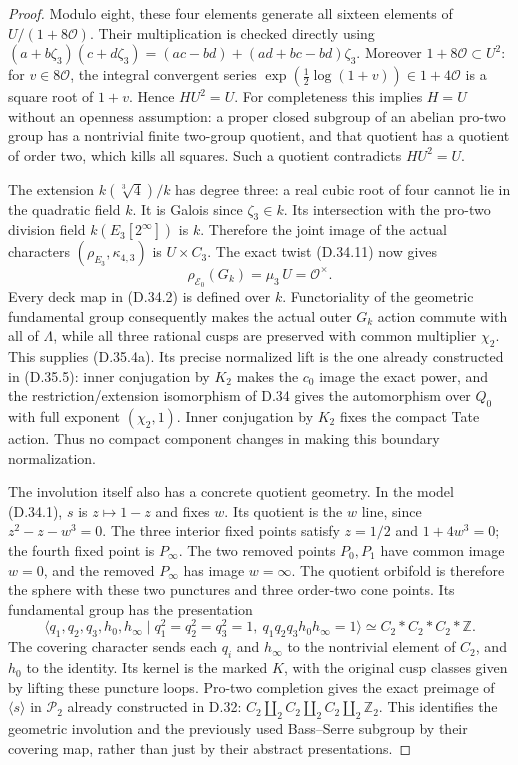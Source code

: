 \begin{proof}
Modulo eight, these four elements generate all sixteen elements of
$U/(1+8\mathcal O)$. Their multiplication is checked directly using
$(a+b\zeta_3)(c+d\zeta_3)
=(ac-bd)+(ad+bc-bd)\zeta_3$.
Moreover $1+8\mathcal O\subset U^2$: for $v\in8\mathcal O$,
the integral convergent series
$\exp(\tfrac12\log(1+v))\in1+4\mathcal O$ is a square root of
$1+v$. Hence $HU^2=U$. For completeness this implies $H=U$ without
an openness assumption: a proper closed subgroup of an abelian
pro-two group has a nontrivial finite two-group quotient, and that
quotient has a quotient of order two, which kills all squares. Such
a quotient contradicts $HU^2=U$.

The extension $k(\sqrt[3]{4})/k$ has degree three: a real cubic root
of four cannot lie in the quadratic field $k$. It is Galois since
$\zeta_3\in k$. Its intersection with the pro-two division field
$k(E_3[2^\infty])$ is $k$. Therefore the joint image of the actual
characters $(\rho_{E_3},\kappa_{4,3})$ is $U\times C_3$.
The exact twist (D.34.11) now gives
\[
          \rho_{\mathcal E_0}(G_k)
             =\mu_3\,U=\mathcal O^\times.            \tag{D.35.14}
\]
Every deck map in (D.34.2) is defined over $k$. Functoriality of the
geometric fundamental group consequently makes the actual outer
$G_k$ action commute with all of $\Lambda$, while all three rational
cusps are preserved with common multiplier $\chi_2$. This supplies
(D.35.4a). Its precise normalized lift is the one already constructed
in (D.35.5): inner conjugation by $K_2$ makes the $c_0$ image the
exact power, and the restriction/extension isomorphism of D.34 gives
the automorphism over $Q_0$ with full exponent $(\chi_2,1)$.
Inner conjugation by $K_2$ fixes the compact Tate action. Thus no
compact component changes in making this boundary normalization.

The involution itself also has a concrete quotient geometry. In the
model (D.34.1), $s$ is $z\mapsto1-z$ and fixes $w$.
Its quotient is the $w$ line, since
$z^2-z-w^3=0$. The three interior fixed points satisfy
$z=1/2$ and $1+4w^3=0$; the fourth fixed point is $P_\infty$.
The two removed points $P_0,P_1$ have common image $w=0$, and the
removed $P_\infty$ has image $w=\infty$. The quotient orbifold is
therefore the sphere with these two punctures and three order-two
cone points. Its fundamental group has the presentation
\[
 \langle q_1,q_2,q_3,h_0,h_\infty\mid
 q_1^2=q_2^2=q_3^2=1,\ q_1q_2q_3h_0h_\infty=1\rangle
       \simeq C_2*C_2*C_2*\mathbb Z.                 \tag{D.35.15}
\]
The covering character sends each $q_i$ and $h_\infty$ to the
nontrivial element of $C_2$, and $h_0$ to the identity. Its kernel is
the marked $K$, with the original cusp classes given by lifting these
puncture loops. Pro-two completion gives the exact preimage of
$\langle s\rangle$ in $\mathcal P_2$ already constructed in D.32:
$C_2\amalg_2C_2\amalg_2C_2\amalg_2\mathbb Z_2$.
This identifies the geometric involution and the previously used
Bass--Serre subgroup by their covering map, rather than just by their
abstract presentations.


\end{proof}
